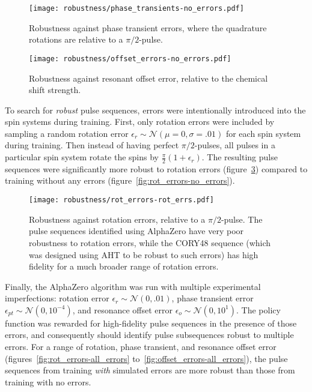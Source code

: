 \begin{figure}[H]
    \centering
    \texttt{[image: robustness/phase\_transients-no\_errors.pdf]}
    \caption{Robustness against phase transient errors, where the quadrature rotations are relative to a $\pi/2$-pulse.
    }
    \label{fig:phase_transients-no_errors}
\end{figure}


\begin{figure}[H]
    \centering
    \texttt{[image: robustness/offset\_errors-no\_errors.pdf]}
    \caption{Robustness against resonant offset error, relative to the chemical shift strength.
    }
    \label{fig:offset_errors-no_errors}
\end{figure}



To search for \emph{robust} pulse sequences, errors were intentionally introduced into the spin systems during training. First, only rotation errors were included by sampling a random rotation error $\epsilon_r \sim \mathcal{N}(\mu=0, \sigma=.01)$ for each spin system during training. Then instead of having perfect $\pi/2$-pulses, all pulses in a particular spin system rotate the spins by $\frac{\pi}{2}(1+\epsilon_r)$. The resulting pulse sequences were significantly more robust to rotation errors (figure~\ref{fig:rot_errors-rot_errors})
compared to training without any errors (figure~\ref{fig:rot_errors-no_errors}).

\begin{figure}[H]
    \centering
    \texttt{[image: robustness/rot\_errors-rot\_errs.pdf]}
    \caption{Robustness against rotation errors, relative to a $\pi/2$-pulse. The pulse sequences identified using AlphaZero have very poor robustness to rotation errors, while the CORY48 sequence (which was designed using AHT to be robust to such errors) has high fidelity for a much broader range of rotation errors.
    }
    \label{fig:rot_errors-rot_errors}
\end{figure}


Finally, the AlphaZero algorithm was run with multiple experimental imperfections: rotation error $\epsilon_r \sim \mathcal{N}(0, .01)$, phase transient error $\epsilon_{pt} \sim \mathcal{N}(0, 10^{-4})$, and resonance offset error $\epsilon_o \sim \mathcal{N}(0, 10^1)$.
The policy function was rewarded for high-fidelity pulse sequences in the presence of those errors, and consequently should identify pulse subsequences robust to multiple errors. For a range of rotation, phase transient, and resonance offset error (figures~\ref{fig:rot_errors-all_errors} to~\ref{fig:offset_errors-all_errors}), the pulse sequences from training \emph{with} simulated errors are more robust than those from training with no errors.

